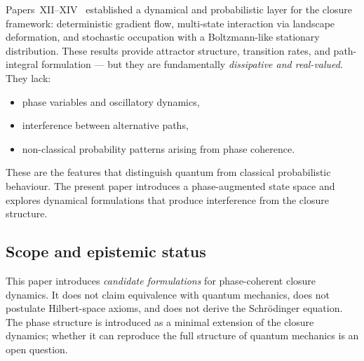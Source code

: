 \documentclass[12pt]{article}
\begin{document}
Papers~XII--XIV~\citep{SmartXII, SmartXIII, SmartXIV} established a dynamical and probabilistic layer for the closure framework: deterministic gradient flow, multi-state interaction via landscape deformation, and stochastic occupation with a Boltzmann-like stationary distribution. These results provide attractor structure, transition rates, and path-integral formulation --- but they are fundamentally \textit{dissipative and real-valued}. They lack:

\begin{itemize}
    \item phase variables and oscillatory dynamics,
    \item interference between alternative paths,
    \item non-classical probability patterns arising from phase coherence.
\end{itemize}

These are the features that distinguish quantum from classical probabilistic behaviour. The present paper introduces a phase-augmented state space and explores dynamical formulations that produce interference from the closure structure.

\subsection*{Scope and epistemic status}

This paper introduces \textit{candidate formulations} for phase-coherent closure dynamics. It does not claim equivalence with quantum mechanics, does not postulate Hilbert-space axioms, and does not derive the Schr\"odinger equation. The phase structure is introduced as a minimal extension of the closure dynamics; whether it can reproduce the full structure of quantum mechanics is an open question.
\end{document}
